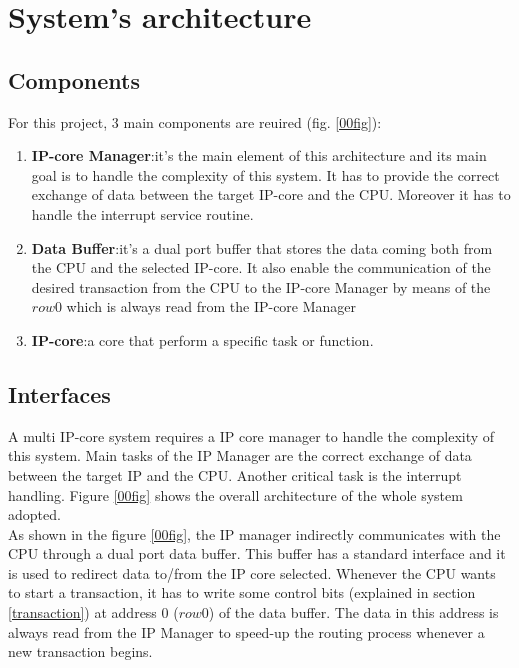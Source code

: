 \chapter{System's architecture}

\section{Components}
For this project, 3 main components are reuired (fig. \ref{00fig}):
\begin{enumerate}
	\item \textbf{IP-core Manager}:it's the main element of this architecture and its main goal is to handle the complexity of this system. It has to provide the correct exchange of data between the target IP-core and the CPU. Moreover it has to handle the interrupt service routine.
	\item \textbf{Data Buffer}:it's a dual port buffer that stores the data coming both from the CPU and the selected IP-core. It also enable the communication of the desired transaction from the CPU to the IP-core Manager by means of the $ row0 $ which is always read from the IP-core Manager
	\item \textbf{IP-core}:a core that perform a specific task or function.
\end{enumerate}
\section{Interfaces}

A multi IP-core system requires a IP core manager to handle the complexity of this system.
Main tasks of the IP Manager are the correct exchange of data between the target IP and the CPU. Another critical task is the interrupt handling. Figure \ref{00fig} shows the overall architecture of the whole system adopted.\\
	
	As shown in the figure \ref{00fig}, the IP manager indirectly communicates with the CPU through a dual port data buffer. This buffer has a standard interface and it is used to redirect data to/from the IP core selected.
	Whenever the CPU wants to start a transaction, it has to write some control bits (explained in section \ref{transaction}) at address 0 ($ row0 $) of the data buffer.
	The data in this address is always read from the IP Manager to speed-up the routing process whenever a new transaction begins.\\
